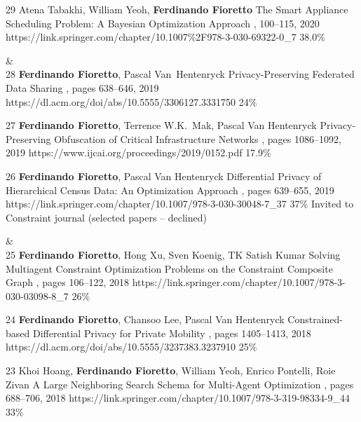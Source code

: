 \begin{pubs}
	\confentry
		{29} %
	    {Atena Tabakhi, William Yeoh, {\bf Ferdinando Fioretto}}
	    {The Smart Appliance Scheduling Problem: A Bayesian Optimization Approach}
	    {\procPRIMA, 100--115, 2020}
	    {https://link.springer.com/chapter/10.1007\%2F978-3-030-69322-0\_7}
	    {38.0\%} %

{}&\nemph{\rule{0.5\linewidth}{0.5pt}}\\[1em]
	\confentry
		{28} %
		{{\bf Ferdinando Fioretto}, Pascal Van~Hentenryck}
		{Privacy-Preserving Federated Data Sharing}
	  	{\procAAMAS, pages 638--646, 2019}
	  	{https://dl.acm.org/doi/abs/10.5555/3306127.3331750}
		{24\%} %

	\confentry
		{27} %
		{{\bf Ferdinando Fioretto}, Terrence W.K.~Mak, Pascal Van Hentenryck}
		{Privacy-Preserving Obfuscation of Critical Infrastructure Networks}
	  	{\procIJCAI, pages 1086--1092, 2019}
	  	{https://www.ijcai.org/proceedings/2019/0152.pdf}
	    {17.9\%} %

	\confentryAwd
		{26} %
		{{\bf Ferdinando Fioretto}, Pascal Van Hentenryck}
		{Differential Privacy of Hierarchical Census Data: An Optimization Approach} 
		{\procCP, pages 639--655, 2019}
		{https://link.springer.com/chapter/10.1007/978-3-030-30048-7\_37}
		{37\%}
		{Invited to Constraint journal}
		{(selected papers -- declined)}

{}&\nemph{\rule{0.5\linewidth}{0.5pt}}\\[1em]
	\confentry 
		{25} %
		{{\bf Ferdinando Fioretto}, Hong Xu, Sven Koenig, TK Satish Kumar}
	 	{Solving Multiagent Constraint Optimization Problems on the Constraint Composite Graph}
		{\procPRIMA, pages 106--122, 2018}
		{https://link.springer.com/chapter/10.1007/978-3-030-03098-8\_7}
	    {26\%} %

	\confentry
		{24} %
	  	{{\bf Ferdinando Fioretto}, Chansoo Lee, Pascal Van Hentenryck}
	  	{Constrained-based Differential Privacy for Private Mobility} 
	  	{\procAAMAS, pages 1405--1413, 2018}
	  	{https://dl.acm.org/doi/abs/10.5555/3237383.3237910}
	    {25\%} %

	\confentry 
		{23} %
		{Khoi Hoang, {\bf Ferdinando Fioretto}, William Yeoh, Enrico Pontelli, Roie Zivan}
		{A Large Neighboring Search Schema for Multi-Agent Optimization}
		{\procCP, pages 688--706, 2018}
		{https://link.springer.com/chapter/10.1007/978-3-319-98334-9\_44}
	    {33\%} %


\end{pubs}
